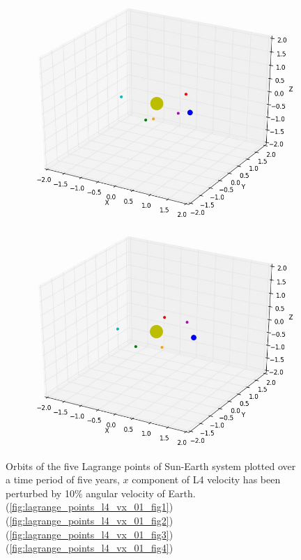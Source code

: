 \documentclass[10pt,letterpaper]{article}
\begin{document}
\begin{figure}[!htb]
  \includegraphics[width=\linewidth]{figures/lagrange_points/lagrange_points_l4_vx_01_3.png}
  \subcaption{}\label{fig:lagrange_points_l4_vx_01_fig3}
\endminipage
{}%
  \includegraphics[width=\linewidth]{figures/lagrange_points/lagrange_points_l4_vx_01_4.png}
  \subcaption{}\label{fig:lagrange_points_l4_vx_01_fig4}
\endminipage
\caption{Orbits of the five Lagrange points of Sun-Earth system plotted over a time period of five years, $x$ component of L4 velocity has been perturbed by 10$\%$ angular velocity of Earth.
(\ref{fig:lagrange_points_l4_vx_01_fig1}) 
(\ref{fig:lagrange_points_l4_vx_01_fig2}) 
(\ref{fig:lagrange_points_l4_vx_01_fig3}) 
(\ref{fig:lagrange_points_l4_vx_01_fig4})}\label{fig:lagrange_points_l4_vx_01}
\end{figure}
\end{document}
